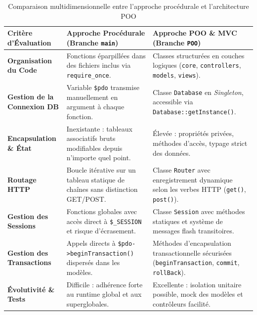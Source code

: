 \documentclass[11pt,a4paper,oneside]{report}
\begin{document}
\begin{table}[H]
    \centering
    \small
    \begin{tabularx}{\textwidth}{lXX}
        \toprule
        \textbf{Critère d'Évaluation} & \textbf{Approche Procédurale (Branche \texttt{main})} & \textbf{Approche POO \& MVC (Branche \texttt{POO})} \\
        \midrule
        \textbf{Organisation du Code} & Fonctions éparpillées dans des fichiers inclus via \texttt{require\_once}. & Classes structurées en couches logiques (\texttt{core}, \texttt{controllers}, \texttt{models}, \texttt{views}). \\
        \addlinespace
        \textbf{Gestion de la Connexion DB} & Variable \texttt{\$pdo} transmise manuellement en argument à chaque fonction. & Classe \texttt{Database} en \textit{Singleton}, accessible via \texttt{Database::getInstance()}. \\
        \addlinespace
        \textbf{Encapsulation \& État} & Inexistante : tableaux associatifs bruts modifiables depuis n'importe quel point. & Élevée : propriétés privées, méthodes d'accès, typage strict des données. \\
        \addlinespace
        \textbf{Routage HTTP} & Boucle itérative sur un tableau statique de chaînes sans distinction GET/POST. & Classe \texttt{Router} avec enregistrement dynamique selon les verbes HTTP (\texttt{get()}, \texttt{post()}). \\
        \addlinespace
        \textbf{Gestion des Sessions} & Fonctions globales avec accès direct à \texttt{\$\_SESSION} et risque d'écrasement. & Classe \texttt{Session} avec méthodes statiques et système de messages flash transitoires. \\
        \addlinespace
        \textbf{Gestion des Transactions} & Appels directs à \texttt{\$pdo->beginTransaction()} dispersés dans les modèles. & Méthodes d'encapsulation transactionnelle sécurisées (\texttt{beginTransaction}, \texttt{commit}, \texttt{rollBack}). \\
        \addlinespace
        \textbf{Évolutivité \& Tests} & Difficile : adhérence forte au runtime global et aux superglobales. & Excellente : isolation unitaire possible, mock des modèles et contrôleurs facilité. \\
        \bottomrule
    \end{tabularx}
    \caption{Comparaison multidimensionnelle entre l'approche procédurale et l'architecture POO}
    \label{tab:comparatif_paradigmes}
\end{table}
\end{document}
